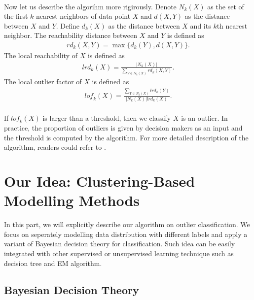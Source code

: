 \documentclass[english]{article}
\newenvironment{eqt}{\begin{equation}\begin{aligned}}{\end{aligned}\end{equation}}
\begin{document}
\paragraph{}
Now let us describe the algorihm more rigirously. Denote $N_k(X)$ as the set of the first $k$ nearest neighbors of data point $X$ and $d(X, Y)$ as the distance between $X$ and $Y$. Define $d_k(X)$ as the distance between $X$ and its $k$th nearest neighbor. The reachability distance between $X$ and $Y$ is defined as
\begin{eqt}
\textit{rd}_k(X, Y) = \max\{d_k(Y), d(X, Y)\}.
\end{eqt}
The local reachability of $X$ is defined as 
\begin{eqt}
\textit{lrd}_k(X) = \frac{|N_k(X)|}{\sum_{Y\in N_k(X)}\textit{rd}_k(X, Y)}.
\end{eqt}
The local outlier factor of $X$ is defined as 
\begin{eqt}
\textit{lof}_k(X) = \frac{\sum_{Y\in N_k(X)}\textit{lrd}_k(Y)}{|N_k(X)|\textit{lrd}_k(X)}.
\end{eqt}
\paragraph{}
If $\textit{lof}_k(X)$ is larger than a threshold, then we classify $X$ is an outlier. In practice, the proportion of outliers is given by decision makers as an input and the threshold is computed by the algorithm. For more detailed description of the algorithm, readers could refer to \cite{lof}.


\section{Our Idea: Clustering-Based Modelling Methods}
\paragraph{}
In this part, we will explicitly describe our algorithm on outlier classification. We focus on seperately modelling data distribution with different labels and apply a variant of Bayesian decision theory for classification. Such idea can be easily integrated with other supervised or unsupervised learning technique such as decision tree and EM algorithm.

\subsection{Bayesian Decision Theory}
\end{document}
